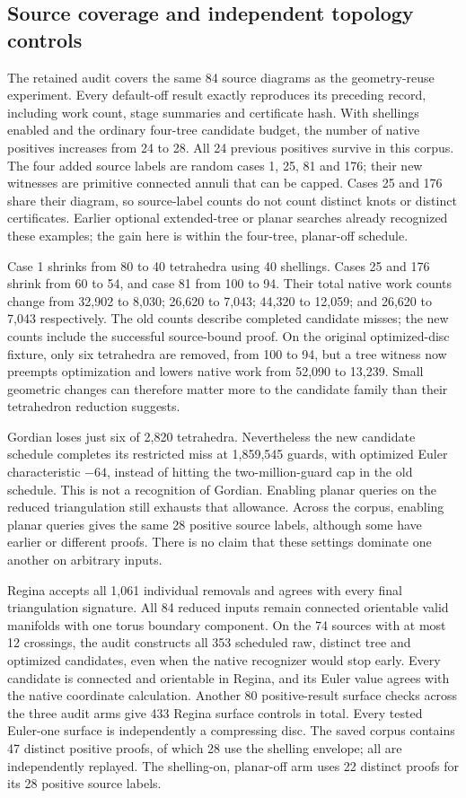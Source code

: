 \subsection{Source coverage and independent topology controls}

The retained audit covers the same 84 source diagrams as the geometry-reuse
experiment. Every default-off result exactly reproduces its preceding record,
including work count, stage summaries and certificate hash. With shellings
enabled and the ordinary four-tree candidate budget, the number of native
positives increases from 24 to 28. All 24 previous positives survive in this
corpus. The four added source labels are random cases 1, 25, 81 and 176; their
new witnesses are primitive connected annuli that can be capped. Cases 25 and
176 share their diagram, so source-label counts do not count distinct knots
or distinct certificates. Earlier optional extended-tree or planar searches
already recognized these examples; the gain here is within the four-tree,
planar-off schedule.

Case 1 shrinks from 80 to 40 tetrahedra using 40 shellings. Cases 25 and 176
shrink from 60 to 54, and case 81 from 100 to 94. Their total native work
counts change from 32,902 to 8,030; 26,620 to 7,043; 44,320 to 12,059; and
26,620 to 7,043 respectively. The old counts describe completed candidate
misses; the new counts include the successful source-bound proof. On the
original optimized-disc fixture, only six tetrahedra are removed, from 100
to 94, but a tree witness now preempts optimization and lowers native work
from 52,090 to 13,239. Small geometric changes can therefore matter more to
the candidate family than their tetrahedron reduction suggests.

Gordian loses just six of 2,820 tetrahedra. Nevertheless the new candidate
schedule completes its restricted miss at 1,859,545 guards, with optimized
Euler characteristic $-64$, instead of hitting the two-million-guard cap in
the old schedule. This is not a recognition of Gordian. Enabling planar
queries on the reduced triangulation still exhausts that allowance. Across
the corpus, enabling planar queries gives the same 28 positive source labels,
although some have earlier or different proofs. There is no claim that these
settings dominate one another on arbitrary inputs.

Regina accepts all 1,061 individual removals and agrees with every final
triangulation signature. All 84 reduced inputs remain connected orientable
valid manifolds with one torus boundary component. On the 74 sources with at
most 12 crossings, the audit constructs all 353 scheduled raw, distinct tree
and optimized candidates, even when the native recognizer would stop early.
Every candidate is connected and orientable in Regina, and its Euler value
agrees with the native coordinate calculation. Another 80 positive-result
surface checks across the three audit arms give 433 Regina surface controls
in total. Every tested Euler-one surface is independently a compressing disc.
The saved corpus contains 47 distinct positive proofs, of which 28 use the
shelling envelope; all are independently replayed. The shelling-on,
planar-off arm uses 22 distinct proofs for its 28 positive source labels.

